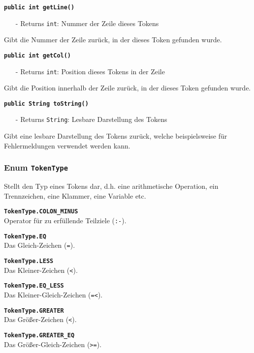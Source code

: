 \documentclass[parskip=full,11pt,twoside]{scrartcl}
\begin{document}
\textbf{\texttt{public int getLine()}}
\begin{itemize}[noitemsep]
	\item[-] Returns \texttt{int}: Nummer der Zeile dieses Tokens
\end{itemize}
Gibt die Nummer der Zeile zurück, in der dieses Token gefunden wurde.

\textbf{\texttt{public int getCol()}}
\begin{itemize}[noitemsep]
	\item[-] Returns \texttt{int}: Position dieses Tokens in der Zeile
\end{itemize}
Gibt die Position innerhalb der Zeile zurück, in der dieses Token gefunden wurde.

\textbf{\texttt{public String toString()}}
\begin{itemize}[noitemsep]
	\item[-] Returns \texttt{String}: Lesbare Darstellung des Tokens
\end{itemize}
Gibt eine lesbare Darstellung des Tokens zurück, welche beispielsweise für Fehlermeldungen verwendet werden kann.

\subsubsection{Enum \texttt{TokenType}}

Stellt den Typ eines Tokens dar, d.h. eine arithmetische Operation, ein Trennzeichen, eine Klammer, eine Variable etc.

\textbf{\texttt{TokenType.COLON\_MINUS}}\\
Operator für zu erfüllende Teilziele (\texttt{:-}).

\textbf{\texttt{TokenType.EQ}}\\
Das Gleich-Zeichen (\texttt{=}).

\textbf{\texttt{TokenType.LESS}}\\
Das Kleiner-Zeichen (\texttt{<}).

\textbf{\texttt{TokenType.EQ\_LESS}}\\
Das Kleiner-Gleich-Zeichen (\texttt{=<}).

\textbf{\texttt{TokenType.GREATER}}\\
Das Größer-Zeichen (\texttt{<}).

\textbf{\texttt{TokenType.GREATER\_EQ}}\\
Das Größer-Gleich-Zeichen (\texttt{>=}).
\end{document}
